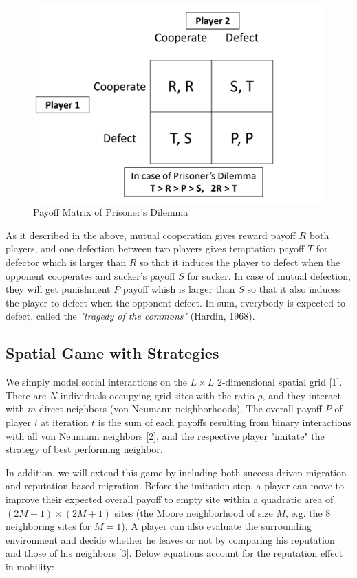 \documentclass[11pt]{article}
\begin{document}
\begin{figure}[!htbp]
	\centering
	\includegraphics[scale=0.75]{../../other/pd_payoff_matrix.png}
    \caption{Payoff Matrix of Prisoner's Dilemma}
    \label{fig:paymatrix}
\end{figure}

\newpage
As it described in the above, mutual cooperation gives reward payoff $R$ both players, and one defection between two players gives temptation payoff $T$ for defector which is larger than $R$ so that it induces the player to defect when the opponent cooperates and sucker's payoff $S$ for sucker. In case of mutual defection, they will get punishment $P$ payoff whish is larger than $S$ so that it also induces the player to defect when the opponent defect. In sum, everybody is expected to defect, called the \textit{"tragedy of the commons"} (Hardin, 1968).


\subsection{Spatial Game with Strategies}

We simply model social interactions on the $L \times L$ 2-dimensional spatial grid [1]. There are $N$ individuals occupying grid sites with the ratio $\rho$, and they interact with $m$ direct neighbors (von Neumann neighborhoods). The overall payoff $P$ of player $i$ at iteration $t$ is the sum of each payoffs resulting from binary interactions with all von Neumann neighbors [2], and the respective player "imitate" the strategy of best performing neighbor.

In addition, we will extend this game by including both success-driven migration and reputation-based migration. Before the imitation step, a player can move to improve their expected overall payoff to empty site within a quadratic area of $(2M+1) \times (2M+1)$ sites (the Moore neighborhood of size $M$, e.g. the 8 neighboring sites for $M = 1$). A player can also evaluate the surrounding environment and decide whether he leaves or not by comparing his reputation and those of his neighbors [3]. Below equations account for the reputation effect in mobility:
\end{document}
